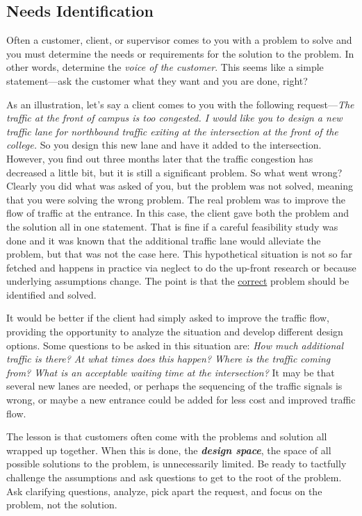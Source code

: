 \subsection{Needs Identification}\label{needs-identification}

Often a customer, client, or supervisor comes to you with a problem to
solve and you must determine the needs or requirements for the solution
to the problem. In other words, determine the \emph{voice of the
customer}. This seems like a simple statement---ask the customer what
they want and you are done, right?

As an illustration, let's say a client comes to you with the following
request---\emph{The traffic at the front of campus is too congested. I
would like you to design a new traffic lane for northbound traffic
exiting at the intersection at the front of the college.} So you design
this new lane and have it added to the intersection. However, you find
out three months later that the traffic congestion has decreased a
little bit, but it is still a significant problem. So what went wrong?
Clearly you did what was asked of you, but the problem was not solved,
meaning that you were solving the wrong problem. The real problem was to
improve the flow of traffic at the entrance. In this case, the client
gave both the problem and the solution all in one statement. That is
fine if a careful feasibility study was done and it was known that the
additional traffic lane would alleviate the problem, but that was not
the case here. This hypothetical situation is not so far fetched and
happens in practice via neglect to do the up-front research or because
underlying assumptions change. The point is that the \ul{correct}
problem should be identified and solved.

It would be better if the client had simply asked to improve the traffic
flow, providing the opportunity to analyze the situation and develop
different design options. Some questions to be asked in this situation
are: \emph{How much additional traffic is there? At what times does this
happen? Where is the traffic coming from? What is an acceptable waiting
time at the intersection?} It may be that several new lanes are needed,
or perhaps the sequencing of the traffic signals is wrong, or maybe a
new entrance could be added for less cost and improved traffic flow.

The lesson is that customers often come with the problems and solution
all wrapped up together. When this is done, the \emph{\textbf{design
space}}, the space of all possible solutions to the problem, is
unnecessarily limited. Be ready to tactfully challenge the assumptions
and ask questions to get to the root of the problem. Ask clarifying
questions, analyze, pick apart the request, and focus on the problem,
not the solution.


